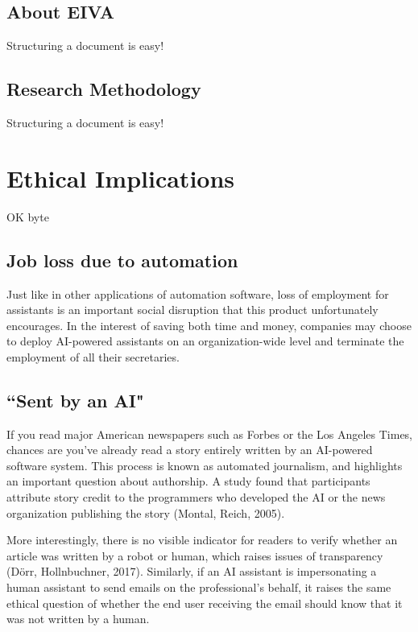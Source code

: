 \documentclass{article}
\begin{document}
\subsection{About EIVA}

Structuring a document is easy!

\subsection{Research Methodology}

Structuring a document is easy!

\section{Ethical Implications}

OK byte

\subsection{Job loss due to automation}

Just like in other applications of automation software, loss of employment for assistants is an important social disruption that this product unfortunately encourages. In the interest of saving both time and money, companies may choose to deploy AI-powered assistants on an organization-wide level and terminate the employment of all their secretaries.

\subsection{``Sent by an AI"}

If you read major American newspapers such as Forbes or the Los Angeles Times, chances are you’ve already read a story entirely written by an AI-powered software system. This process is known as automated journalism, and highlights an important question about authorship. A study found that participants attribute story credit to the programmers who developed the AI or the news organization publishing the story (Montal, Reich, 2005).

More interestingly, there is no visible indicator for readers to verify whether an article was written by a robot or human, which raises issues of transparency (Dörr, Hollnbuchner, 2017). Similarly, if an AI assistant is impersonating a human assistant to send emails on the professional's behalf, it raises the same ethical question of whether the end user receiving the email should know that it was not written by a human.
\end{document}
